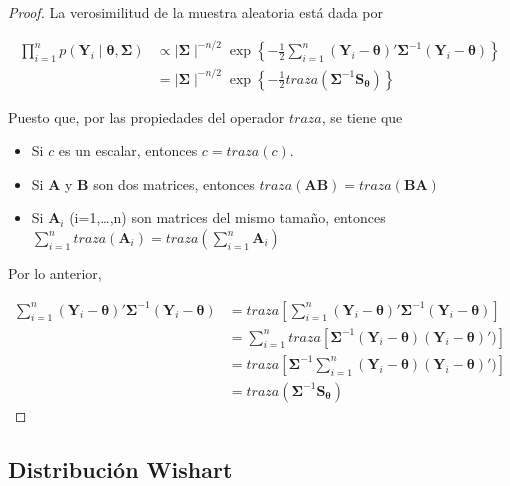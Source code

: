 \documentclass[
  10pt,
  spanish,
]{book}
\providecommand{\tightlist}{%
  \setlength{\itemsep}{0pt}\setlength{\parskip}{0pt}}
\theoremstyle{definition}
\theoremstyle{definition}
\theoremstyle{definition}
\theoremstyle{definition}
\theoremstyle{remark}
\begin{document}
\begin{proof}
{}La verosimilitud de la muestra aleatoria está dada por

\begin{align*}
\prod_{i=1}^np(\mathbf{Y}_i \mid \boldsymbol \theta,\boldsymbol \Sigma)
&\propto \mid \boldsymbol \Sigma\mid ^{-n/2}\exp\left\{-\frac{1}{2}\sum_{i=1}^n
(\mathbf{Y}_i-\boldsymbol \theta)'\boldsymbol \Sigma^{-1}(\mathbf{Y}_i-\boldsymbol \theta)\right\}\\
&= \mid \boldsymbol \Sigma\mid ^{-n/2}\exp\left\{-\frac{1}{2}traza\left(\boldsymbol \Sigma^{-1}\mathbf{S}_{\boldsymbol \theta}\right)\right\}
\end{align*}

Puesto que, por las propiedades del operador \(traza\), se tiene que

\begin{itemize}
\tightlist
\item
  Si \(c\) es un escalar, entonces \(c=traza(c)\).
\item
  Si \(\mathbf{A}\) y \(\mathbf{B}\) son dos matrices, entonces \(traza(\mathbf{AB})=traza(\mathbf{BA})\)
\item
  Si \(\mathbf{A}_i\) (i=1,\ldots,n) son matrices del mismo tamaño, entonces \(\sum_{i=1}^ntraza(\mathbf{A}_i)=traza\left(\sum_{i=1}^n\mathbf{A}_i\right)\)
\end{itemize}

Por lo anterior,

\begin{align*}
\sum_{i=1}^n(\mathbf{Y}_i-\boldsymbol \theta)'\boldsymbol \Sigma^{-1}(\mathbf{Y}_i-\boldsymbol \theta)
&=traza\left[\sum_{i=1}^n(\mathbf{Y}_i-\boldsymbol \theta)'\boldsymbol \Sigma^{-1}(\mathbf{Y}_i-\boldsymbol \theta)\right]\\
&=\sum_{i=1}^ntraza[\boldsymbol \Sigma^{-1}(\mathbf{Y}_i-\boldsymbol \theta)(\mathbf{Y}_i-\boldsymbol \theta)')]\\
&=traza\left[\boldsymbol \Sigma^{-1}\sum_{i=1}^n(\mathbf{Y}_i-\boldsymbol \theta)(\mathbf{Y}_i-\boldsymbol \theta)')\right]\\
&=traza(\boldsymbol \Sigma^{-1}\mathbf{S}_{\boldsymbol \theta})
\end{align*}
\end{proof}

\hypertarget{distribuciuxf3n-wishart}{%
\subsection{Distribución Wishart}\label{distribuciuxf3n-wishart}}
\end{document}
